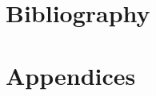 \documentclass[11pt]{report}
\begin{document}








\part{Bibliography}



\part{Appendices}
\appendix


\end{document}
